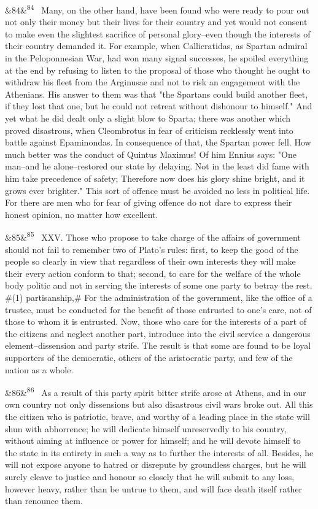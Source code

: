 \documentclass[12pt]{article}
\newcommand{\para}[1][]{\par\noindent\ifx&#1&\else\textsuperscript{\footnotesize #1}~\fi}
\begin{document}
\para[84] Many, on the other hand, have been found who were ready to pour out not only their money but their lives for their country and yet would not consent to make even the slightest sacrifice of personal glory--even though the interests of their country demanded it. For example, when Callicratidas, as Spartan admiral in the Peloponnesian War, had won many signal successes, he spoiled everything at the end by refusing to listen to the proposal of those who thought he ought to withdraw his fleet from the Arginusae and not to risk an engagement with the Athenians. His answer to them was that "the Spartans could build another fleet, if they lost that one, but he could not retreat without dishonour to himself." And yet what he did dealt only a slight blow to Sparta; there was another which proved disastrous, when Cleombrotus in fear of criticism recklessly went into battle against Epaminondas. In consequence of that, the Spartan power fell. How much better was the conduct of Quintus Maximus! Of him Ennius says: "One man--and he alone--restored our state by delaying. Not in the least did fame with him take precedence of safety; Therefore now does his glory shine bright, and it grows ever brighter." This sort of offence must be avoided no less in political life. For there are men who for fear of giving offence do not dare to express their honest opinion, no matter how excellent.

\para[85] XXV. Those who propose to take charge of the affairs of government should not fail to remember two of Plato's rules: first, to keep the good of the people so clearly in view that regardless of their own interests they will make their every action conform to that; second, to care for the welfare of the whole body politic and not in serving the interests of some one party to betray the rest. \#(1) partisanship,\# For the administration of the government, like the office of a trustee, must be conducted for the benefit of those entrusted to one's care, not of those to whom it is entrusted. Now, those who care for the interests of a part of the citizens and neglect another part, introduce into the civil service a dangerous element--dissension and party strife. The result is that some are found to be loyal supporters of the democratic, others of the aristocratic party, and few of the nation as a whole.

\para[86] As a result of this party spirit bitter strife arose at Athens, and in our own country not only dissensions but also disastrous civil wars broke out. All this the citizen who is patriotic, brave, and worthy of a leading place in the state will shun with abhorrence; he will dedicate himself unreservedly to his country, without aiming at influence or power for himself; and he will devote himself to the state in its entirety in such a way as to further the interests of all. Besides, he will not expose anyone to hatred or disrepute by groundless charges, but he will surely cleave to justice and honour so closely that he will submit to any loss, however heavy, rather than be untrue to them, and will face death itself rather than renounce them.
\end{document}
